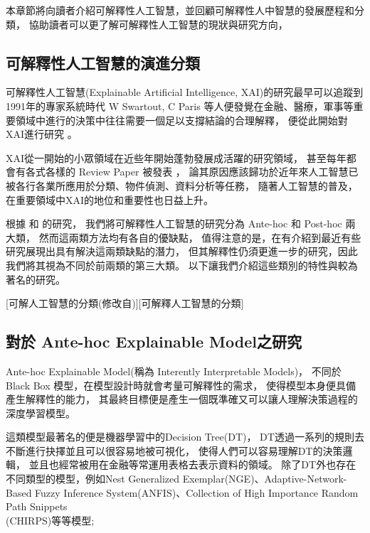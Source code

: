 \documentclass[class=NCU_thesis, crop=false]{standalone}
\begin{document}
本章節將向讀者介紹可解釋性人工智慧，並回顧可解釋性人中智慧的發展歷程和分類，
協助讀者可以更了解可解釋性人工智慧的現狀與研究方向，


\subsection{可解釋性人工智慧的演進分類}
可解釋性人工智慧(Explainable Artificial Intelligence, XAI)的研究最早可以追蹤到1991年的專家系統時代 W Swartout, C Paris 等人便發覺在金融、醫療，軍事等重要領域中進行的決策中往往需要一個足以支撐結論的合理解釋，
便從此開始對XAI進行研究 \cite{87686}。

XAI從一開始的小眾領域在近些年開始蓬勃發展成活躍的研究領域，
甚至每年都會有各式各樣的 Review Paper 被發表\cite{A2023100230} \cite{10188681}，
論其原因應該歸功於近年來人工智慧已被各行各業所應用於分類、物件偵測、資料分析等任務，
隨著人工智慧的普及，在重要領域中XAI的地位和重要性也日益上升。

根據 \cite{Nielsen_2022} 和 \cite{LONGO2024102301} 的研究，
我們將可解釋性人工智慧的研究分為 Ante-hoc 和 Post-hoc 兩大類，
然而這兩類方法均有各自的優缺點，
值得注意的是，在\cite{LONGO2024102301}有介紹到最近有些研究展現出具有解決這兩類缺點的潛力，
但其解釋性仍須更進一步的研究，因此我們將其視為不同於前兩類的第三大類。
以下讓我們介紹這些類別的特性與較為著名的研究。

[可解人工智慧的分類(修改自\cite{YangCNNInterpretable})][可解釋人工智慧的分類]

\subsection{對於 Ante-hoc Explainable Model之研究}
Ante-hoc Explainable Model(\cite{Nielsen_2022}稱為 Interently Interpretable Models)，
不同於 Black Box 模型，在模型設計時就會考量可解釋性的需求，
使得模型本身便具備產生解釋性的能力，
其最終目標便是產生一個既準確又可以讓人理解決策過程的深度學習模型。

這類模型最著名的便是機器學習中的Decision Tree(DT)\cite{rokach2016decision}，
DT透過一系列的規則去不斷進行抉擇並且可以很容易地被可視化，
使得人們可以容易理解DT的決策邏輯，
並且也經常被用在金融等常運用表格去表示資料的領域\cite{grinsztajn2022tree}。
除了DT外也存在不同類型的模型，例如Nest Generalized Exemplar(NGE)\cite{salzberg1991nearest}、Adaptive-Network-Based Fuzzy Inference System(ANFIS)\cite{256541}、Collection of High Importance Random Path Snippets\\(CHIRPS)\cite{hatwell2020chirps}等等模型;
\end{document}
